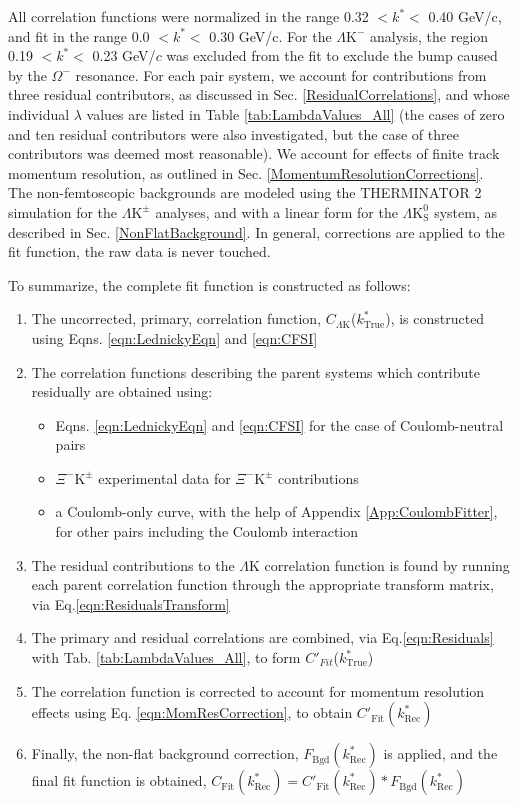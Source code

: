 \documentclass[ALICE,manyauthors]{cernphprep}
\newcommand{\ktrue}{$k^{*}_{\mathrm{True}}$\xspace}
\newcommand{\LamK}{$\Lambda$K\xspace}
\newcommand{\LamKchM}{$\Lambda\mathrm{K^{-}}$\xspace}
\newcommand{\LamKpm}{$\Lambda\mathrm{K^{\pm}}$\xspace}
\newcommand{\LamKs}{$\Lambda\mathrm{K^{0}_{S}}$\xspace}
\newcommand{\XiKpm}{$\Xi^{-}\mathrm{K^{\pm}}$\xspace}
\begin{document}
All correlation functions were normalized in the range 0.32 $< k^{*} <$ 0.40 GeV/c, and fit in the range 0.0 $< k^{*} <$ 0.30 GeV/c.
For the \LamKchM analysis, the region 0.19 $< k^{*} <$ 0.23 GeV/$c$ was excluded from the fit to exclude the bump caused by the $\Omega^{-}$ resonance.
For each pair system, we account for contributions from three residual contributors, as discussed in Sec. \ref{ResidualCorrelations}, and whose individual $\lambda$ values are listed in Table \ref{tab:LambdaValues_All} (the cases of zero and ten residual contributors were also investigated, but the case of three contributors was deemed most reasonable).
We account for effects of finite track momentum resolution, as outlined in Sec. \ref{MomentumResolutionCorrections}.
The non-femtoscopic backgrounds are modeled using the THERMINATOR 2 simulation for the \LamKpm analyses, and with a linear form for the \LamKs system, as described in Sec. \ref{NonFlatBackground}.
In general, corrections are applied to the fit function, the raw data is never touched.

To summarize, the complete fit function is constructed as follows:
\begin{enumerate}
 \item The uncorrected, primary, correlation function, $C_{\Lambda\mathrm{K}}$(\ktrue), is constructed using Eqns. \ref{eqn:LednickyEqn} and \ref{eqn:CFSI}
 \item The correlation functions describing the parent systems which contribute residually are obtained using:
 \begin{itemize}
  \item Eqns. \ref{eqn:LednickyEqn} and \ref{eqn:CFSI} for the case of Coulomb-neutral pairs
  \item \XiKpm experimental data for \XiKpm contributions
  \item a Coulomb-only curve, with the help of Appendix \ref{App:CoulombFitter}, for other pairs including the Coulomb interaction 
 \end{itemize} 
 \item The residual contributions to the \LamK correlation function is found by running each parent correlation function through the appropriate transform matrix, via Eq.\ref{eqn:ResidualsTransform}
 \item The primary and residual correlations are combined, via Eq.\ref{eqn:Residuals} with Tab. \ref{tab:LambdaValues_All}, to form $C'_{Fit}$(\ktrue)
 \item The correlation function is corrected to account for momentum resolution effects using Eq. \ref{eqn:MomResCorrection}, to obtain $C'_{\mathrm{Fit}}(k^{*}_{\mathrm{Rec}})$
 \item Finally, the non-flat background correction, $F_{\mathrm{Bgd}}(k^{*}_{\mathrm{Rec}})$ is applied, and the final fit function is obtained, $C_{\mathrm{Fit}}(k^{*}_{\mathrm{Rec}}) = C'_{\mathrm{Fit}}(k^{*}_{\mathrm{Rec}})*F_{\mathrm{Bgd}}(k^{*}_{\mathrm{Rec}})$
\end{enumerate}
\end{document}
